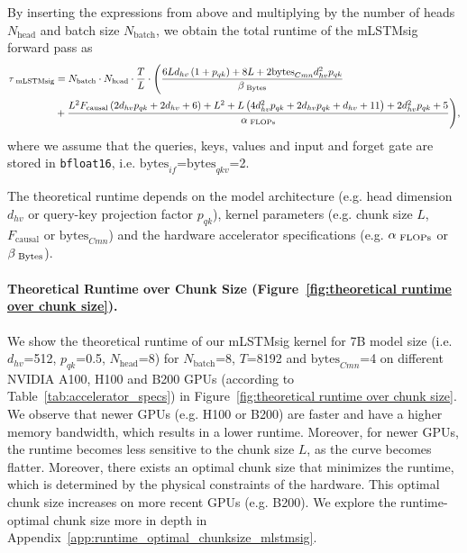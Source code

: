 \documentclass{article}
\begin{document}
    By inserting the expressions from above and multiplying by the number of heads $N_\text{head}$ and batch size $N_\text{batch}$, we obtain the total runtime of the mLSTMsig forward pass as
    \begin{equation}
        \label{eq:theoretical_runtime_mlstmsig}
        \begin{aligned}
            \tau_\text{ mLSTMsig} & = N_{\text{batch}} \cdot N_{\text{head}} \cdot \frac{T}{L} \cdot \Bigg( \frac{6 L d_{hv} \left( 1 + p_{qk}\right) + 8 L + 2 \text{bytes}_{Cmn} d_{hv}^{2} p_{qk}}{\beta_{\text{ Bytes}{{}}}}                \\
                                  & + \frac{L^2 F_{\text{causal}}\left(2 d_{hv} p_{qk} + 2 d_{hv} + 6\right) + L^2 + L \left(4d_{hv}^{2} p_{qk} + 2 d_{hv} p_{qk} + d_{hv} + 11\right) + 2 d_{hv}^{2} p_{qk} + 5}{\alpha_{\text{ FLOPs}{{}}}}\Bigg),
        \end{aligned}
    \end{equation}
    where we assume that the queries, keys, values and input and forget gate are stored in \texttt{bfloat16}, i.e. $\text{bytes}_{if}$=$ \text{bytes}_{qkv}$=2.

    The theoretical runtime depends on the model architecture (e.g. head dimension $d_{hv}$ or query-key projection factor $p_{qk}$), kernel parameters (e.g. chunk size $L$, $F_\text{causal}$ or $\text{bytes}_{Cmn}$) and the hardware accelerator specifications (e.g. $\alpha_{\text{ FLOPs}{{}}}$ or $\beta_{\text{ Bytes}{{}}}$).

    \paragraph{Theoretical Runtime over Chunk Size (Figure~\ref{fig:theoretical runtime over chunk size}).}
    We show the theoretical runtime of our mLSTMsig kernel for 7B model size (i.e. $d_{hv}$=512, $p_{qk}$=0.5, $N_{\text{head}}$=8) for $N_{\text{batch}}$=8, $T$=8192 and $\text{bytes}_{Cmn}$=4 on different NVIDIA A100, H100 and B200 GPUs (according to Table~\ref{tab:accelerator_specs}) in Figure~\ref{fig:theoretical runtime over chunk size}.
    We observe that newer GPUs (e.g. H100 or B200) are faster and have a higher memory bandwidth, which results in a lower runtime.
    Moreover, for newer GPUs, the runtime becomes less sensitive to the chunk size $L$, as the curve becomes flatter. 
    Moreover, there exists an optimal chunk size that minimizes the runtime, which is determined by the physical constraints of the hardware.
    This optimal chunk size increases on more recent GPUs (e.g. B200).
    We explore the runtime-optimal chunk size more in depth in Appendix~\ref{app:runtime_optimal_chunksize_mlstmsig}.
\end{document}
